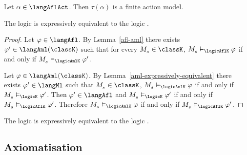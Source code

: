 \begin{lemma}
Let $\alpha \in \langAflAct$. Then $\tau(\alpha)$ is a finite action model.
\end{lemma}

\begin{proposition}
The logic \logicAflK{} is expressively equivalent to the logic \logicAmlK{}. 
\end{proposition}

\begin{proof}
Let $\phi \in \langAfl$.
By Lemma~\ref{afl-aml} there exists $\phi' \in \langAml(\classK)$ such that for every $\kPModel{\kStateS} \in \classK$, $\kPModel{\kStateS} \entails_\logicAflK \phi$ if and only if $\kPModel{\kStateS} \entails_\logicAmlK \phi'$.

Let $\phi \in \langAml(\classK)$.
By Lemma~\ref{aml-expressively-equivalent} there exists $\phi' \in \langMl$ such that $\kPModel{\kStateS} \in \classK$, $\kPModel{\kStateS} \entails_\logicAmlK \phi$ if and only if $\kPModel{\kStateS} \entails_\logicK \phi'$.
Then $\phi' \in \langAfl$ and $\kPModel{\kStateS} \entails_\logicK \phi'$ if and only if $\kPModel{\kStateS} \entails_\logicAflK \phi'$.
Therefore $\kPModel{\kStateS} \entails_\logicAmlK \phi$ if and only if $\kPModel{\kStateS} \entails_\logicAflK \phi'$.
\end{proof}

\begin{corollary}
The logic \logicAflK{} is expressively equivalent to the logic \logicK{}.
\end{corollary}

\subsection{Axiomatisation}

